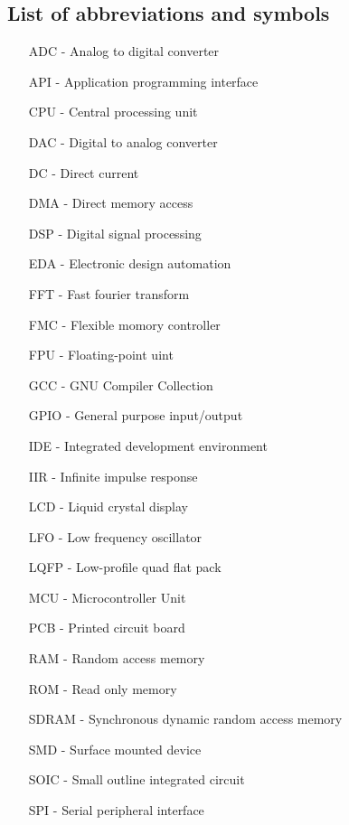 \documentclass[a4paper,twoside,12pt]{book}
\begin{document}
\begin{appendices} 

\chapter*{List of abbreviations and symbols}

\begin{itemize}
\item[ADC] - Analog to digital converter
\item[API] - Application programming interface
\item[CPU] - Central processing unit
\item[DAC] - Digital to analog converter
\item[DC] - Direct current
\item[DMA] - Direct memory access
\item[DSP] - Digital signal processing
\item[EDA] - Electronic design automation
\item[FFT] - Fast fourier transform
\item[FMC] - Flexible momory controller
\item[FPU] - Floating-point uint
\item[GCC] - GNU Compiler Collection
\item[GPIO] - General purpose input/output
\item[IDE] - Integrated development environment
\item[IIR] - Infinite impulse response
\item[LCD] - Liquid crystal display
\item[LFO] - Low frequency oscillator
\item[LQFP] - Low-profile quad flat pack
\item[MCU] - Microcontroller Unit
\item[PCB] - Printed circuit board
\item[RAM] - Random access memory
\item[ROM] - Read only memory
\item[SDRAM] - Synchronous dynamic random access memory
\item[SMD] - Surface mounted device
\item[SOIC] - Small outline integrated circuit
\item[SPI] - Serial peripheral interface
\end{itemize}


\end{appendices}
\end{document}
